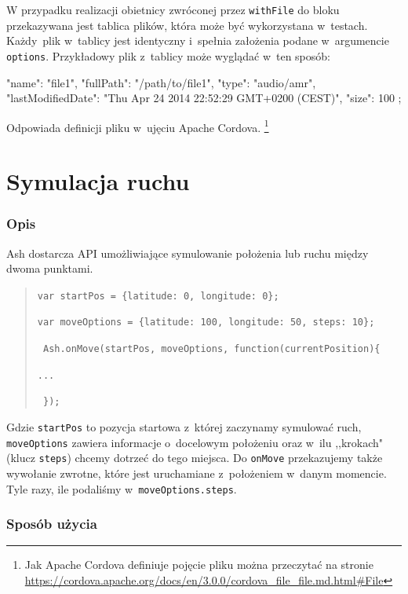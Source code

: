 \documentclass[brudnopis]{xmgr}
\begin{document}
W przypadku realizacji obietnicy zwróconej przez \texttt{withFile} do bloku przekazywana jest tablica plików, która może być wykorzystana w~testach. Każdy~plik w~tablicy jest identyczny i~spełnia założenia podane w~argumencie \texttt{options}. Przykładowy plik z~tablicy może wyglądać w~ten sposób:

\begin{javascriptcode}
   {
       "name": "file1",
       "fullPath": "/path/to/file1",
       "type": "audio/amr",
       "lastModifiedDate": 
            "Thu Apr 24 2014 22:52:29 GMT+0200 (CEST)",
       "size": 100
   };
\end{javascriptcode}

Odpowiada definicji pliku w~ujęciu Apache Cordova. 
\footnote{Jak Apache Cordova definiuje pojęcie pliku można przeczytać na stronie \url{https://cordova.apache.org/docs/en/3.0.0/cordova_file_file.md.html\#File} }

\section{Symulacja ruchu}

\subsubsection{Opis}
Ash dostarcza API umożliwiające symulowanie położenia lub ruchu między dwoma punktami.

\begin{quote}
  \texttt{var startPos = \{latitude: 0, longitude: 0\};}

  \texttt{var moveOptions = \{latitude: 100, longitude: 50, steps: 10\};}

  \texttt{ Ash.onMove(startPos, moveOptions, function(currentPosition)\{  }

    \texttt{...} 

  \texttt{   \});  }
\end{quote}

Gdzie \texttt{startPos} to pozycja startowa z~której zaczynamy symulować ruch, \texttt{moveOptions} zawiera informacje o~docelowym położeniu oraz w~ilu ,,krokach" (klucz \texttt{steps}) chcemy dotrzeć do tego miejsca. Do \texttt{onMove} przekazujemy także wywołanie zwrotne, które jest uruchamiane z~położeniem w~danym momencie. Tyle razy, ile podaliśmy w~\texttt{moveOptions.steps}. 

\subsubsection{Sposób użycia}
\end{document}
